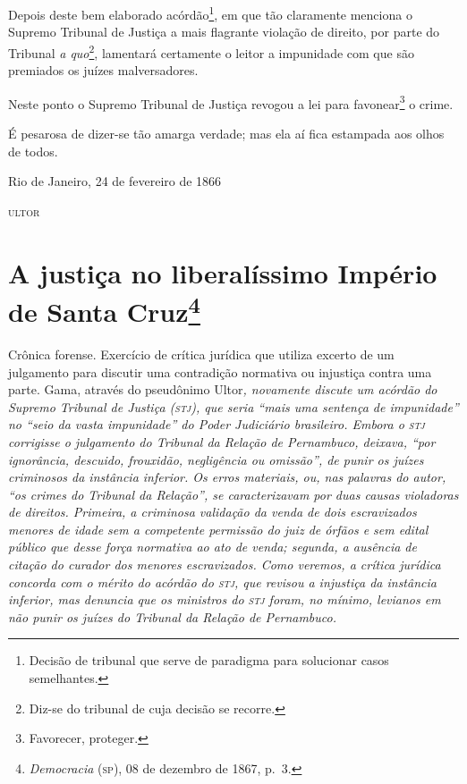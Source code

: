 Depois deste bem elaborado acórdão\footnote{Decisão de tribunal que
  serve de paradigma para solucionar casos semelhantes.}, em que tão
claramente menciona o Supremo Tribunal de Justiça a mais flagrante
violação de direito, por parte do Tribunal \emph{a quo}\footnote{
  Diz-se do tribunal de cuja decisão se recorre.}, lamentará certamente
o leitor a impunidade com que são premiados os juízes malversadores.

Neste ponto o Supremo Tribunal de Justiça revogou a lei para
favonear\footnote{Favorecer, proteger.} o crime.

É pesarosa de dizer-se tão amarga verdade; mas ela aí fica estampada aos
olhos de todos.

\begin{flushright}
Rio de Janeiro, 24 de fevereiro de 1866

\textsc{ultor}
\end{flushright}

\chapter{A justiça no liberalíssimo Império de Santa Cruz\footnote{\emph{Democracia} (\textsc{sp}), 08 de dezembro de 1867, p.~3.}}

\begin{didascalia}
Crônica forense. Exercício de crítica jurídica que utiliza excerto de um
julgamento para discutir uma contradição normativa ou injustiça contra
uma parte. Gama, através do pseudônimo Ultor\emph{, novamente discute
um acórdão do Supremo Tribunal de Justiça (\textsc{stj}), que seria ``mais uma
sentença de impunidade'' no ``seio da vasta impunidade'' do Poder
Judiciário brasileiro. Embora o \textsc{stj} corrigisse o julgamento do Tribunal
da Relação de Pernambuco, deixava, ``por ignorância, descuido, frouxidão,
negligência ou omissão'', de punir os juízes criminosos da instância
inferior. Os erros materiais, ou, nas palavras do autor, ``os crimes do
Tribunal da Relação'', se caracterizavam por duas causas violadoras de
direitos. Primeira, a criminosa validação da venda de dois escravizados
menores de idade sem a competente permissão do juiz de órfãos e sem
edital público que desse força normativa ao ato de venda; segunda, a
ausência de citação do curador dos menores escravizados. Como veremos, a
crítica jurídica concorda com o mérito do acórdão do \textsc{stj}, que revisou a
injustiça da instância inferior, mas denuncia que os ministros do \textsc{stj}
foram, no mínimo, levianos em não punir os juízes do Tribunal da Relação
de Pernambuco.}
\end{didascalia}




